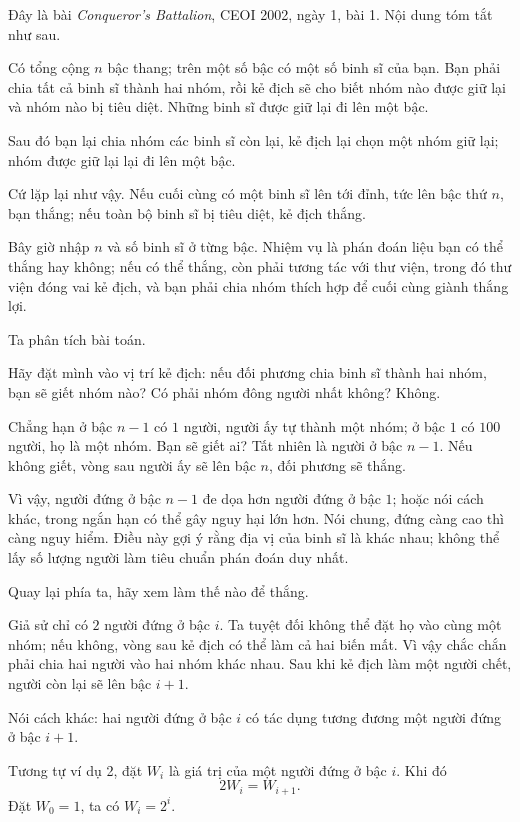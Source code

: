 \documentclass[11pt]{article}
\begin{document}
Đây là bài \textit{Conqueror's Battalion}, CEOI 2002, ngày 1, bài 1. Nội dung
tóm tắt như sau.

Có tổng cộng \(n\) bậc thang; trên một số bậc có một số binh sĩ của bạn. Bạn
phải chia tất cả binh sĩ thành hai nhóm, rồi kẻ địch sẽ cho biết nhóm nào
được giữ lại và nhóm nào bị tiêu diệt. Những binh sĩ được giữ lại đi lên một
bậc.

Sau đó bạn lại chia nhóm các binh sĩ còn lại, kẻ địch lại chọn một nhóm giữ
lại; nhóm được giữ lại lại đi lên một bậc.

Cứ lặp lại như vậy. Nếu cuối cùng có một binh sĩ lên tới đỉnh, tức lên bậc
thứ \(n\), bạn thắng; nếu toàn bộ binh sĩ bị tiêu diệt, kẻ địch thắng.

Bây giờ nhập \(n\) và số binh sĩ ở từng bậc. Nhiệm vụ là phán đoán liệu bạn có
thể thắng hay không; nếu có thể thắng, còn phải tương tác với thư viện, trong
đó thư viện đóng vai kẻ địch, và bạn phải chia nhóm thích hợp để cuối cùng
giành thắng lợi.

Ta phân tích bài toán.

Hãy đặt mình vào vị trí kẻ địch: nếu đối phương chia binh sĩ thành hai nhóm,
bạn sẽ giết nhóm nào? Có phải nhóm đông người nhất không? Không.

Chẳng hạn ở bậc \(n-1\) có \(1\) người, người ấy tự thành một nhóm; ở bậc
\(1\) có \(100\) người, họ là một nhóm. Bạn sẽ giết ai? Tất nhiên là người ở
bậc \(n-1\). Nếu không giết, vòng sau người ấy sẽ lên bậc \(n\), đối phương
sẽ thắng.

Vì vậy, người đứng ở bậc \(n-1\) đe dọa hơn người đứng ở bậc \(1\); hoặc nói
cách khác, trong ngắn hạn có thể gây nguy hại lớn hơn. Nói chung, đứng càng
cao thì càng nguy hiểm. Điều này gợi ý rằng địa vị của binh sĩ là khác nhau;
không thể lấy số lượng người làm tiêu chuẩn phán đoán duy nhất.

Quay lại phía ta, hãy xem làm thế nào để thắng.

Giả sử chỉ có \(2\) người đứng ở bậc \(i\). Ta tuyệt đối không thể đặt họ vào
cùng một nhóm; nếu không, vòng sau kẻ địch có thể làm cả hai biến mất. Vì vậy
chắc chắn phải chia hai người vào hai nhóm khác nhau. Sau khi kẻ địch làm một
người chết, người còn lại sẽ lên bậc \(i+1\).

Nói cách khác: hai người đứng ở bậc \(i\) có tác dụng tương đương một người
đứng ở bậc \(i+1\).

Tương tự ví dụ 2, đặt \(W_i\) là giá trị của một người đứng ở bậc \(i\). Khi
đó
\[
  2W_i=W_{i+1}.
\]
Đặt \(W_0=1\), ta có \(W_i=2^i\).
\end{document}
